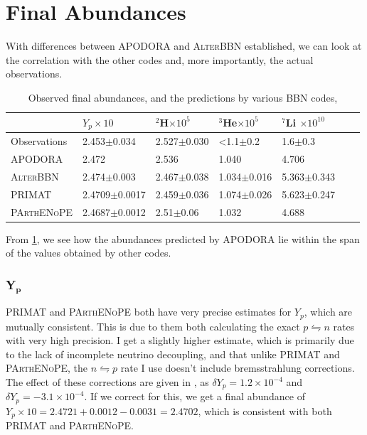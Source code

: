 \section{Final Abundances}
\label{sec:finalabun}
With differences between APODORA and \textsc{AlterBBN} established, we can look at the correlation with the other codes and, more importantly, the actual observations. 
\begin{table}[ht]
    \begin{tabular}{l|llllll}
               & $Y_p \times 10$ & \hspace{-0.34em}$^{2}$H$ \times 10^{5}$ & \hspace{-0.34em}$^{3}$He$ \times 10^{5}$ & \hspace{-0.34em}$^{7}$Li $ \times 10^{10}$\\ \hline
    Observations  & 2.453$\pm$0.034    & 2.527$\pm$0.030 & <1.1$\pm$0.2 & 1.6$\pm$0.3    \\ \hline
    APODORA  & 2.472            & 2.536 & 1.040 & 4.706     \\ \hline
    \textsc{AlterBBN} & 2.474$\pm$0.003 & 2.467$\pm$0.038 & 1.034$\pm$0.016 & 5.363$\pm$0.343    \\ \hline
    PRIMAT & 2.4709$\pm$0.0017   & 2.459$\pm$0.036 & 1.074$\pm$0.026 & 5.623$\pm$0.247   \\ \hline
    \textsc{PArthENoPE}& 2.4687$\pm$0.0012     & 2.51$\pm$0.06 & 1.032  & 4.688      
    \end{tabular}
    \caption{Observed final abundances\cite{Yp_Aver_2021}\cite{deuterium_Cooke_2018}\cite{Allobsabun}, and the predictions by various BBN codes\cite{AlterBBN}\cite{PRIMAT}\cite{PArthENoPE},}
    \label{tab:Obsabun}
\end{table}
From \cref{tab:Obsabun}, we see how the abundances predicted by APODORA lie within the span of the values obtained by other codes. 

\subsubsection{Y$_\textbf{p}$}
PRIMAT and \textsc{PArthENoPE} both have very precise estimates for $Y_p$, which are mutually consistent. This is due to them both calculating the exact $p\leftrightharpoons n$ rates with very high precision. I get a slightly higher estimate, which is primarily due to the lack of incomplete neutrino decoupling, and that unlike PRIMAT and \textsc{PArthENoPE}, the $n \leftrightharpoons p$ rate I use doesn't include bremsstrahlung corrections\cite{Serpico_2004}. The effect of these corrections are given in \textcite[table V]{PRIMAT}, as $\delta Y_p = 1.2\times10^{-4}$ and $\delta Y_p = -3.1\times10^{-4}$. If we correct for this, we get a final abundance of $Y_p\times 10 = 2.4721+0.0012-0.0031=2.4702$, which is consistent with both PRIMAT and \textsc{PArthENoPE}.

